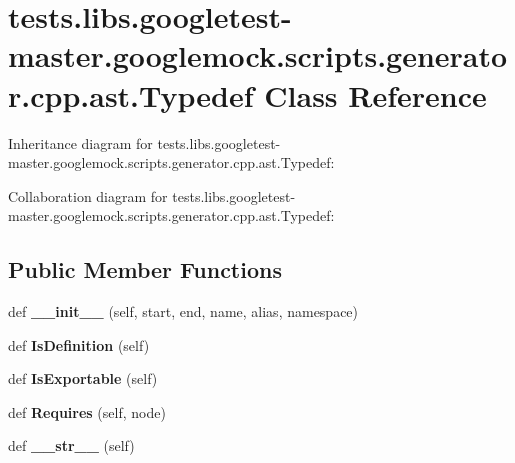 \hypertarget{classtests_1_1libs_1_1googletest-master_1_1googlemock_1_1scripts_1_1generator_1_1cpp_1_1ast_1_1Typedef}{}\section{tests.\+libs.\+googletest-\/master.googlemock.\+scripts.\+generator.\+cpp.\+ast.\+Typedef Class Reference}
\label{classtests_1_1libs_1_1googletest-master_1_1googlemock_1_1scripts_1_1generator_1_1cpp_1_1ast_1_1Typedef}


Inheritance diagram for tests.\+libs.\+googletest-\/master.googlemock.\+scripts.\+generator.\+cpp.\+ast.\+Typedef\+:


Collaboration diagram for tests.\+libs.\+googletest-\/master.googlemock.\+scripts.\+generator.\+cpp.\+ast.\+Typedef\+:
\subsection*{Public Member Functions}
\begin{DoxyCompactItemize}
\item 
\mbox{\label{classtests_1_1libs_1_1googletest-master_1_1googlemock_1_1scripts_1_1generator_1_1cpp_1_1ast_1_1Typedef_a39104451740b9b6b7bd70780d3b873e6}} 
def {\bfseries \+\_\+\+\_\+init\+\_\+\+\_\+} (self, start, end, name, alias, namespace)
\item 
\mbox{\label{classtests_1_1libs_1_1googletest-master_1_1googlemock_1_1scripts_1_1generator_1_1cpp_1_1ast_1_1Typedef_aee4bc3c76d957811c4e8c6e548f44c36}} 
def {\bfseries Is\+Definition} (self)
\item 
\mbox{\label{classtests_1_1libs_1_1googletest-master_1_1googlemock_1_1scripts_1_1generator_1_1cpp_1_1ast_1_1Typedef_a50cac805c487e2f834e8ae5d283428fe}} 
def {\bfseries Is\+Exportable} (self)
\item 
\mbox{\label{classtests_1_1libs_1_1googletest-master_1_1googlemock_1_1scripts_1_1generator_1_1cpp_1_1ast_1_1Typedef_a6fa105a289d79ade7a7dc84e26ae2fe9}} 
def {\bfseries Requires} (self, node)
\item 
\mbox{\label{classtests_1_1libs_1_1googletest-master_1_1googlemock_1_1scripts_1_1generator_1_1cpp_1_1ast_1_1Typedef_afd50c68e5c84805bbb8eced165083dc3}} 
def {\bfseries \+\_\+\+\_\+str\+\_\+\+\_\+} (self)
\end{DoxyCompactItemize}
